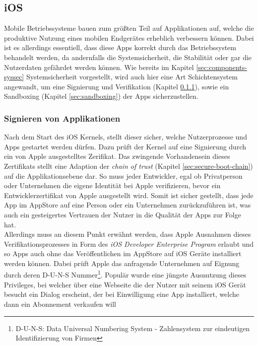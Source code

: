 \subsection{iOS}
	Mobile Betriebssysteme bauen zum größten Teil auf Applikationen auf, welche
	die produktive Nutzung eines mobilen Endgerätes erheblich verbessern können.
	Dabei ist es allerdings essentiell, dass diese Apps korrekt durch das
	Betriebssystem behandelt werden, da andernfalls die Systemsicherheit, die
	Stabilität oder gar die Nutzerdaten gefährdet werden können. Wie bereits im
	Kapitel \ref{sec:components-syssec} Systemsicherheit vorgestellt, wird auch
	hier eine Art Schichtensystem angewandt, um eine Signierung und Verifikation
	(Kapitel \ref{sec:appsigning}), sowie ein Sandboxing (Kapitel
	\ref{sec:sandboxing}) der Apps sicherzustellen.
	
	\subsubsection{Signieren von Applikationen}\label{sec:appsigning}
		Nach dem Start des iOS Kernels, stellt dieser sicher, welche Nutzerprozesse
		und Apps gestartet werden dürfen. Dazu prüft der Kernel auf eine Signierung
		durch ein von Apple ausgestelltes Zerifikat. Das zwingende Vorhandensein
		dieses Zertifikats stellt eine Adaption der \textsl{chain of trust} (Kapitel
		\ref{sec:secure-boot-chain}) auf die Applikationsebene dar. So muss jeder
		Entwickler, egal ob Privatperson oder Unternehmen die eigene Identität bei
		Apple verifizieren, bevor ein Entwicklerzertifikat von Apple ausgestellt
		wird. Somit ist sicher gestellt, dass jede App im AppStore auf eine Person
		oder ein Unternehmen zurückzuführen ist, was auch ein gesteigertes Vertrauen
		der Nutzer in die Qualität der Apps zur Folge hat.\\
		Allerdings muss an diesem Punkt erwähnt werden, dass Apple Ausnahmen dieses
		Verifikationsprozesses in Form des \textsl{iOS Developer Enterprise
		Program} \cite{AppleDevProg2015}
		erlaubt und so Apps auch ohne das Veröffentlichen im AppStore auf iOS Geräte
		installiert werden können. Dabei prüft Apple das anfragende Unternehmen auf
		Eignung durch deren D-U-N-S Nummer\footnote{D-U-N-S: Data Universal Numbering
		System - Zahlensystem zur eindeutigen Identifizierung von Firmen}. Populär wurde eine jüngste Ausnutzung dieses
		Privileges, bei welcher über eine Webseite die der Nutzer mit seinem iOS
		Gerät besucht ein Dialog erscheint, der bei Einwilligung eine App
		installiert, welche dann ein Abonnement verkaufen will
